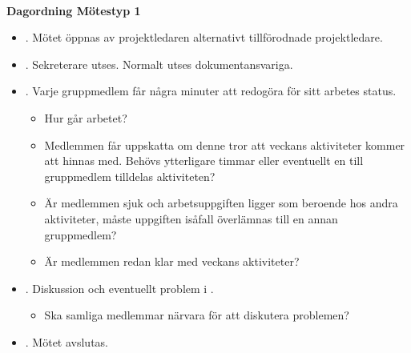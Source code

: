 \documentclass[titlepage, a4paper]{article}
\begin{document}
{\ }\vspace{5mm}

\begin{center}
  \textbf{\Huge Dagordning Mötestyp 1}
\end{center}

\vspace{10mm}

\begin{itemize}
\item{. Mötet öppnas av projektledaren alternativt tillförodnade projektledare.}
\item{. Sekreterare utses. Normalt utses dokumentansvariga.}
\item{. Varje gruppmedlem får några minuter att redogöra för sitt arbetes status.
\begin{itemize}
\item{Hur går arbetet?}
\item{Medlemmen får uppskatta om denne tror att veckans aktiviteter kommer att hinnas med. Behövs ytterligare timmar eller eventuellt en till gruppmedlem tilldelas aktiviteten?}
\item{Är medlemmen sjuk och arbetsuppgiften ligger som beroende hos andra aktiviteter, måste uppgiften isåfall överlämnas till en annan gruppmedlem?}
\item{Är medlemmen redan klar med veckans aktiviteter?}
\end{itemize}
}
\item{. Diskussion och eventuellt problem i .
\begin{itemize}
\item{Ska samliga medlemmar närvara för att diskutera problemen?}
\end{itemize}
}
\item{. Mötet avslutas.}
\end{itemize}
\end{document}
